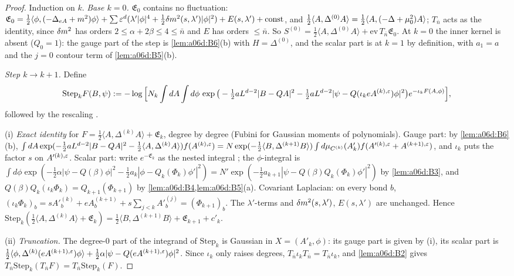 \begin{proof}
Induction on $k$. \emph{Base $k=0$.} $\mathfrak E_0$ contains no fluctuation: $\mathfrak E_0=\frac12\langle\phi,(-\Delta_{eA}+m^2)\phi\rangle+\sum\varepsilon^d(\lambda'|\phi|^4+\frac12\delta m^2(s,\lambda')|\phi|^2)+E(s,\lambda')+\mathrm{const}$, and $\frac12\langle A,\Delta^{(0)}A\rangle=\frac12\langle A,(-\Delta+\mu_0^2)A\rangle$; $T_{\bar n}$ acts as the identity, since $\delta m^2$ has orders $2\le\alpha+2\beta\le4\le\bar n$ \cite[p.~417]{Ba3} and $E$ has orders $\le\bar n$. So $S^{(0)}=\frac12\langle A,\Delta^{(0)}A\rangle+\mathrm{ev}\,T_{\bar n}\mathfrak E_0$. At $k=0$ the inner kernel is absent ($Q_0=1$): the gauge part of the step is \cref{lem:a06d:B6}(b) with $H=\Delta^{(0)}$, and the scalar part is \cite[(3.35)]{Ba1} at $k=1$ by definition, with $a_1=a$ and the $j=0$ contour term of \cref{lem:a06d:B5}(b).

\emph{Step $k\to k+1$.} Define
\[
\mathrm{Step}_kF(B,\psi):=-\log\Big[N_k\int dA\int d\phi\,\exp\big(-\tfrac12aL^{d-2}|B-QA|^2-\tfrac12aL^{d-2}|\psi-Q(\iota_keA^{(k),\varepsilon})\phi|^2\big)e^{-\iota_kF(A,\phi)}\Big],
\]
followed by the rescaling \cite[(1.22)]{Ba1}.

(i) \emph{Exact identity} for $F=\frac12\langle A,\Delta^{(k)}A\rangle+\mathfrak E_k$, degree by degree (Fubini for Gaussian moments of polynomials). Gauge part: by \cref{lem:a06d:B6}(b),
$\int dA\exp(-\frac12aL^{d-2}|B-QA|^2-\frac12\langle A,\Delta^{(k)}A\rangle)f(A^{(k),\varepsilon})=N\exp(-\frac12\langle B,\Delta^{(k+1)}B\rangle)\int d\mu_{C^{(k)}}(A'_k)f(A'^{(k),\varepsilon}+A^{(k+1),\varepsilon})$, and $\iota_k$ puts the factor $s$ on $A'^{(k),\varepsilon}$. Scalar part: write $e^{-\mathfrak E_k}$ as the nested integral \cite[(3.35)]{Ba1}; the $\phi$-integral is $\int d\phi\exp(-\frac12\alpha|\psi-Q(\beta)\phi|^2-\frac12a_k|\phi-Q_k(\Phi_k)\phi'|^2)=N'\exp(-\frac12a_{k+1}|\psi-Q(\beta)Q_k(\Phi_k)\phi'|^2)$ by \cref{lem:a06d:B3}, and $Q(\beta)Q_k(\iota_k\Phi_k)=Q_{k+1}(\Phi_{k+1})$ by \cref{lem:a06d:B4,lem:a06d:B5}(a). Covariant Laplacian: on every bond $b$, $(\iota_k\Phi_k)_b=sA'^{(k)}_b+eA^{(k+1)}_b+s\sum_{j<k}A'^{(j)}_b=(\Phi_{k+1})_b$. The $\lambda'$-terms and $\delta m^2(s,\lambda')$, $E(s,\lambda')$ are unchanged. Hence $\mathrm{Step}_k(\frac12\langle A,\Delta^{(k)}A\rangle+\mathfrak E_k)=\frac12\langle B,\Delta^{(k+1)}B\rangle+\mathfrak E_{k+1}+c'_k$.

(ii) \emph{Truncation.} The degree-$0$ part of the integrand of $\mathrm{Step}_k$ is Gaussian in $X=(A'_k,\phi)$: its gauge part is given by (i), its scalar part is $\frac12\langle\phi,\Delta^{(k)}(eA^{(k+1),\varepsilon})\phi\rangle+\frac12\alpha|\psi-Q(eA^{(k+1),\varepsilon})\phi|^2$. Since $\iota_k$ only raises degrees, $T_{\bar n}\iota_kT_{\bar n}=T_{\bar n}\iota_k$, and \cref{lem:a06d:B2} gives $T_{\bar n}\mathrm{Step}_k(T_{\bar n}F)=T_{\bar n}\mathrm{Step}_k(F)$.


\end{proof}
